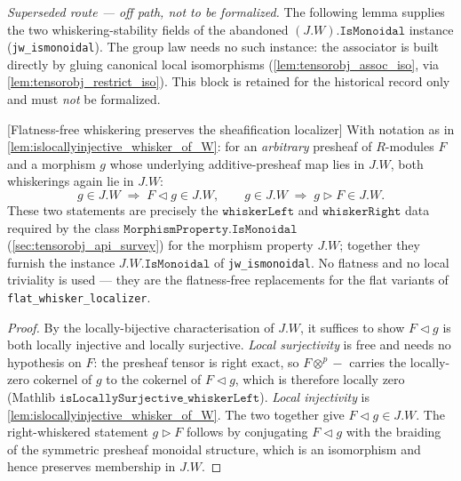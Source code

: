 \emph{Superseded route --- off path, not to be formalized.} The following lemma
supplies the two whiskering-stability fields of the abandoned
\((J.W).\mathtt{IsMonoidal}\) instance (\texttt{jw\_ismonoidal}). The group law
needs no such instance: the associator is built directly by gluing canonical local
isomorphisms (\cref{lem:tensorobj_assoc_iso}, via \cref{lem:tensorobj_restrict_iso}).
This block is retained for the historical record only and must \emph{not} be
formalized.

\begin{lemma}

\leanok
[Flatness-free whiskering preserves the sheafification localizer]
  \label{lem:whisker_of_W}
  With notation as in \cref{lem:islocallyinjective_whisker_of_W}: for an
  \emph{arbitrary} presheaf of \(R\)-modules \(F\) and a morphism \(g\) whose
  underlying additive-presheaf map lies in \(J.W\), both whiskerings again lie in
  \(J.W\):
  \[
    g \in J.W \;\Longrightarrow\; F \triangleleft g \in J.W,
    \qquad
    g \in J.W \;\Longrightarrow\; g \triangleright F \in J.W .
  \]
  These two statements are precisely the \(\mathtt{whiskerLeft}\) and
  \(\mathtt{whiskerRight}\) data required by the class
  \(\mathtt{MorphismProperty.IsMonoidal}\) (\cref{sec:tensorobj_api_survey}) for
  the morphism property \(J.W\); together they furnish the instance
  \(J.W.\mathtt{IsMonoidal}\) of \texttt{jw\_ismonoidal}. No flatness and no
  local triviality is used --- they are the flatness-free replacements for the
  flat variants of \texttt{flat\_whisker\_localizer}.
\end{lemma}

\begin{proof}
  \leanok
  By the locally-bijective characterisation of \(J.W\), it suffices to show
  \(F \triangleleft g\) is both locally injective and locally surjective.
  \emph{Local surjectivity} is free and needs no hypothesis on \(F\): the presheaf
  tensor is right exact, so \(F \otimes^{p} -\) carries the locally-zero cokernel
  of \(g\) to the cokernel of \(F \triangleleft g\), which is therefore locally
  zero (Mathlib \(\mathtt{isLocallySurjective\_whiskerLeft}\)). \emph{Local
  injectivity} is \cref{lem:islocallyinjective_whisker_of_W}. The two together
  give \(F \triangleleft g \in J.W\). The right-whiskered statement
  \(g \triangleright F\) follows by conjugating \(F \triangleleft g\) with the
  braiding of the symmetric presheaf monoidal structure, which is an isomorphism
  and hence preserves membership in \(J.W\).
\end{proof}

